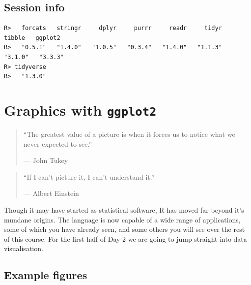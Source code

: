 \documentclass[
]{book}
\newenvironment{Shaded}{\begin{snugshade}}{\end{snugshade}}
\newcommand{\FunctionTok}[1]{\textcolor[rgb]{0.00,0.00,0.00}{#1}}
\newcommand{\NormalTok}[1]{#1}
\newcommand{\SpecialCharTok}[1]{\textcolor[rgb]{0.00,0.00,0.00}{#1}}
\newcommand{\StringTok}[1]{\textcolor[rgb]{0.31,0.60,0.02}{#1}}
\begin{document}
\hypertarget{session-info-2}{%
\section{Session info}\label{session-info-2}}

\begin{Shaded}
\end{Shaded}

\begin{verbatim}
R>   forcats   stringr     dplyr     purrr     readr     tidyr    tibble   ggplot2 
R>   "0.5.1"   "1.4.0"   "1.0.5"   "0.3.4"   "1.4.0"   "1.1.3"   "3.1.0"   "3.3.3" 
R> tidyverse 
R>   "1.3.0"
\end{verbatim}

\hypertarget{graphics}{%
\chapter{\texorpdfstring{Graphics with \textbf{\texttt{ggplot2}}}{Graphics with ggplot2}}\label{graphics}}

\begin{quote}
``The greatest value of a picture is when it forces us to notice what we never expected to see.''

--- John Tukey
\end{quote}

\begin{quote}
``If I can't picture it, I can't understand it.''

--- Albert Einstein
\end{quote}

Though it may have started as statistical software, R has moved far beyond it's mundane origins. The language is now capable of a wide range of applications, some of which you have already seen, and some others you will see over the rest of this course. For the first half of Day 2 we are going to jump straight into data visualisation.

\hypertarget{example-figures}{%
\section{Example figures}\label{example-figures}}
\end{document}
